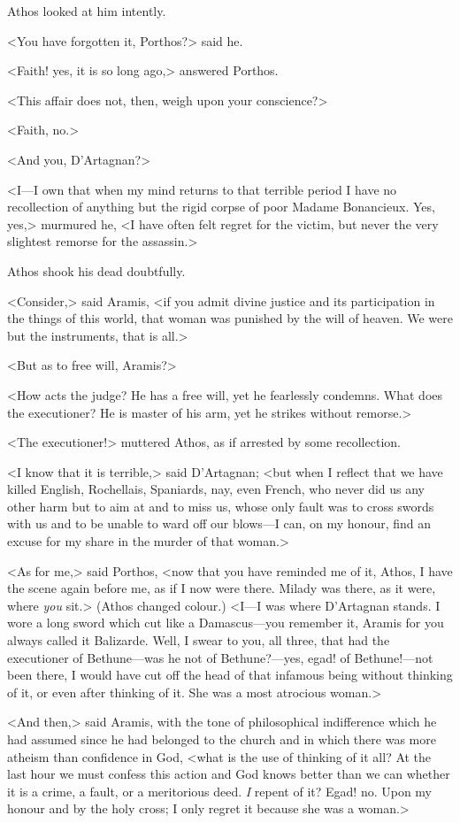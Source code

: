 Athos looked at him intently.

<You have forgotten it, Porthos?> said he.

<Faith! yes, it is so long ago,> answered Porthos.

<This affair does not, then, weigh upon your conscience?>

<Faith, no.>

<And you, D'Artagnan?>

<I—I own that when my mind returns to that terrible period I have no recollection of anything but the rigid corpse of poor Madame Bonancieux. Yes, yes,> murmured he, <I have often felt regret for the victim, but never the very slightest remorse for the assassin.>

Athos shook his dead doubtfully.

<Consider,> said Aramis, <if you admit divine justice and its participation in the things of this world, that woman was punished by the will of heaven. We were but the instruments, that is all.>

<But as to free will, Aramis?>

<How acts the judge? He has a free will, yet he fearlessly condemns. What does the executioner? He is master of his arm, yet he strikes without remorse.>

<The executioner!> muttered Athos, as if arrested by some recollection.

<I know that it is terrible,> said D'Artagnan; <but when I reflect that we have killed English, Rochellais, Spaniards, nay, even French, who never did us any other harm but to aim at and to miss us, whose only fault was to cross swords with us and to be unable to ward off our blows—I can, on my honour, find an excuse for my share in the murder of that woman.>

<As for me,> said Porthos, <now that you have reminded me of it, Athos, I have the scene again before me, as if I now were there. Milady was there, as it were, where \textit{you} sit.> (Athos changed colour.) <I—I was where D'Artagnan stands. I wore a long sword which cut like a Damascus—you remember it, Aramis for you always called it Balizarde. Well, I swear to you, all three, that had the executioner of Bethune—was he not of Bethune?—yes, egad! of Bethune!—not been there, I would have cut off the head of that infamous being without thinking of it, or even after thinking of it. She was a most atrocious woman.>

<And then,> said Aramis, with the tone of philosophical indifference which he had assumed since he had belonged to the church and in which there was more atheism than confidence in God, <what is the use of thinking of it all? At the last hour we must confess this action and God knows better than we can whether it is a crime, a fault, or a meritorious deed. \textit{I} repent of it? Egad! no. Upon my honour and by the holy cross; I only regret it because she was a woman.>

